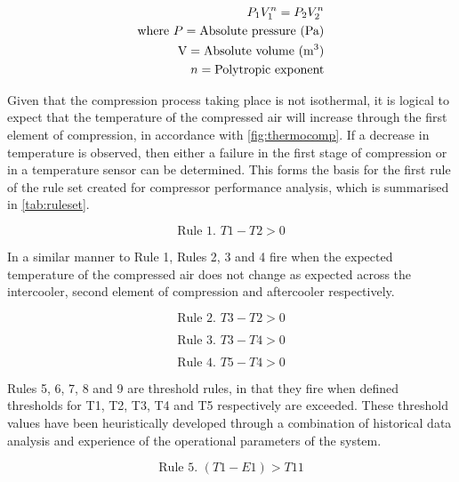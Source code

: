 \begin{eqnarray}
\label{eq:polytropcompression}
P_1 V_1^n = P_2 V_2^n \\
\text{where}~P = \text{Absolute pressure (Pa)} \nonumber \\
\text{V} = \text{Absolute volume (m\textsuperscript{3})} \nonumber \\ 
n = \text{Polytropic exponent} \nonumber
\end{eqnarray} 

Given that the compression process taking place is not isothermal, it is logical to expect that the temperature of the compressed air will increase through the first element of compression, in accordance with \autoref{fig:thermocomp}. If a decrease in temperature is observed, then either a failure in the first stage of compression or in a temperature sensor can be determined. This forms the basis for the first rule of the rule set created for compressor performance analysis, which is summarised in \autoref{tab:ruleset}.

\begin{equation}
\text{Rule 1. } T1 - T2 > 0
\label{eq:rule1}
\end{equation}

In a similar manner to Rule 1, Rules 2, 3 and 4 fire when the expected temperature of the compressed air does not change as expected across the intercooler, second element of compression and aftercooler respectively.

\begin{equation}
\text{Rule 2. } T3 - T2 >0
\label{eq:rule2}
\end{equation}

\begin{equation}
\text{Rule 3. } T3 - T4 >0
\label{eq:rule3}
\end{equation}

\begin{equation}
\text{Rule 4. } T5 - T4 > 0
\label{eq:rule4}
\end{equation}

Rules 5, 6, 7, 8 and 9 are threshold rules, in that they fire when defined thresholds for T1, T2, T3, T4 and T5 respectively are exceeded. These threshold values have been heuristically developed through a combination of historical data analysis and experience of the operational parameters of the system.

\begin{equation}
\text{Rule 5. } (T1-E1) > T11
\label{eq:rule5}
\end{equation}

